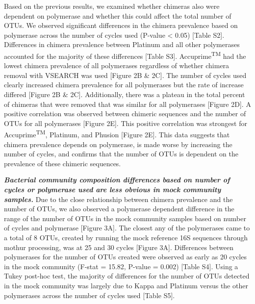 \documentclass[11pt,]{article}
\begin{document}
Based on the previous results, we examined whether chimeras also were
dependent on polymerase and whether this could affect the total number
of OTUs. We observed significant differences in the chimera prevalence
based on polymerase across the number of cycles used (P-value
\textless{} 0.05) {[}Table S2{]}. Differences in chimera prevalence
between Platinum and all other polymerases accounted for the majority of
these differences {[}Table S3{]}. Accuprime\textsuperscript{TM} had the
lowest chimera prevalence of all polymerases regardless of whether
chimera removal with VSEARCH was used {[}Figure 2B \& 2C{]}. The number
of cycles used clearly increased chimera prevalence for all polymerases
but the rate of increase differed {[}Figure 2B \& 2C{]}. Additionally,
there was a plateau in the total percent of chimeras that were removed
that was similar for all polymerases {[}Figure 2D{]}. A positive
correlation was observed between chimeric sequences and the number of
OTUs for all polymerases {[}Figure 2E{]}. This positive correlation was
strongest for Accuprime\textsuperscript{TM}, Platinum, and Phusion
{[}Figure 2E{]}. This data suggests that chimera prevalence depends on
polymerase, is made worse by increasing the number of cycles, and
confirms that the number of OTUs is dependent on the prevalence of these
chimeric sequences.

\textbf{\emph{Bacterial community composition differences based on
number of cycles or polymerase used are less obvious in mock community
samples.}} Due to the close relationship between chimera prevalence and
the number of OTUs, we also observed a polymerase dependent difference
in the range of the number of OTUs in the mock community samples based
on number of cycles and polymerase {[}Figure 3A{]}. The closest any of
the polymerases came to a total of 8 OTUs, created by running the mock
reference 16S sequences through mothur processing, was at 25 and 30
cycles {[}Figure 3A{]}. Differences between polymerases for the number
of OTUs created were observed as early as 20 cycles in the mock
community (F-stat = 15.82, P-value = 0.002) {[}Table S4{]}. Using a
Tukey post-hoc test, the majority of differences for the number of OTUs
detected in the mock community was largely due to Kappa and Platinum
versus the other polymerases across the number of cycles used {[}Table
S5{]}.
\end{document}
